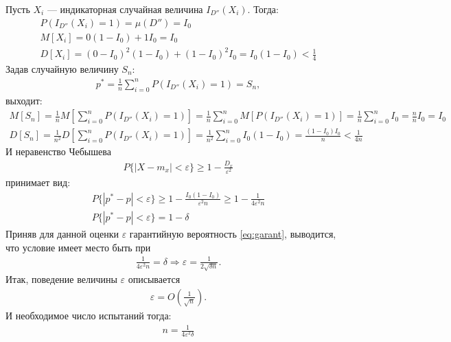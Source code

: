 Пусть \(X_i\) --- индикаторная случайная величина \(I_{D''}(X_i)\). Тогда:
\begin{align}
	P(I_{D''}(X_i)=1) = \mu(D'') = I_0 \\
	M[X_i] = 0(1 - I_0) + 1 I_0 = I_0  \\
	D[X_i] = (0 - I_0)^2 (1 - I_0) + (1 - I_0)^2 I_0 = I_0(1-I_0) < \frac{1}{4}
\end{align}
Задав случайную величину \(S_n\):
\begin{align}
	p^* = \frac{1}{n}\sum_{i=0}^n P(I_{D''}(X_i) = 1) = S_n,
\end{align}
выходит:
\begin{align}
	M[S_n] = \frac{1}{n}M[\sum_{i=0}^n P(I_{D''}(X_i) = 1)] = \frac{1}{n}\sum_{i=0}^n M[P(I_{D''}(X_i) = 1)] = \frac{1}{n}\sum_{i=0}^n I_0 = \frac{n}{n}I_0 = I_0 \\
	D[S_n] = \frac{1}{n^2}D[\sum_{i=0}^n P(I_{D''}(X_i) = 1)] =  \frac{1}{n^2}\sum_{i=0}^n I_0(1-I_0) = \frac{(1 - I_0)I_0}{n} < \frac{1}{4n}
\end{align}
И неравенство Чебышева
\begin{align}
	P\{|X-m_x|<\varepsilon\} \geq 1 - \frac{D_x}{\varepsilon^2}
\end{align}
принимает вид:
\begin{align}
	P\{|p^* - p|<\varepsilon\} \geq 1 - \frac{I_0(1-I_0)}{\varepsilon^2 n} \geq 1 - \frac{1}{4 \varepsilon^2 n} \\
	\label{eq:garant}
	P\{|p^* - p|<\varepsilon\} = 1 - \delta
\end{align}
Приняв для данной оценки \(\varepsilon\) гарантийную вероятность \cref{eq:garant}, выводится, что условие имеет место быть при
\begin{align}
	\frac{1}{4 \varepsilon^2 n} = \delta \Longrightarrow \varepsilon = \frac{1}{2\sqrt{\delta n}}.
\end{align}
Итак, поведение величины \(\varepsilon\) описывается
\begin{align}\label{eq:o-desc}
	\varepsilon = O\left(\frac{1}{\sqrt{n}}\right).
\end{align}
И необходимое число испытаний тогда:
\begin{align}
	n = \frac{1}{4 \varepsilon^2 \delta}
\end{align}
